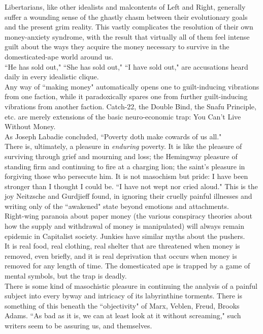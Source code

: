 Libertarians, like other idealists and malcontents of Left and Right, generally suffer a wounding sense of the ghastly chasm between their evolutionary goals and the present grim reality. This vastly complicates the resolution of their own money-anxiety syndrome, with the result that virtually all of them feel intense guilt about the ways they acquire the money necessary to survive in the domesticated-ape world around us.\\
``He has sold out," ``She has sold out," ``I have sold out," are accusations heard daily in every idealistic clique.\\
Any way of ``making money" automatically opens one to guilt-inducing vibrations from one faction, while it paradoxically spares one from further guilt-inducing vibrations from another faction. Catch-22, the Double Bind, the Snafu Principle, etc. are merely extensions of the basic neuro-economic trap: You Can't Live Without Money.\\
As Joseph Labadie concluded, ``Poverty doth make cowards of us all."\\
There is, ultimately, a pleasure in \emph{enduring} poverty. It is like the pleasure of surviving through grief and mourning and loss; the Hemingway pleasure of standing firm and continuing to fire at a charging lion; the saint's pleasure in forgiving those who persecute him. It is not masochism but pride: I have been stronger than I thought I could be. ``I have not wept nor cried aloud." This is the joy Neitzsche and Gurdjieff found, in ignoring their cruelly painful illnesses and writing only of the ``awakened" state beyond emotions and attachments.\\
Right-wing paranoia about paper money (the various conspiracy theories about how the supply and withdrawal of money is manipulated) will always remain epidemic in Capitalist society. Junkies have similar myths about the pushers.\\
It is real food, real clothing, real shelter that are threatened when money is removed, even briefly, and it is real deprivation that occurs when money is removed for any length of time. The domesticated ape is trapped by a game of mental symbols, but the trap is deadly.\\
There is some kind of masochistic pleasure in continuing the analysis of a painful subject into every byway and intricacy of its labyrinthine torments. There is something of this beneath the ``objectivity" of Marx, Veblen, Freud, Brooks Adams. ``As bad as it is, we can at least look at it without screaming," such writers seem to be assuring us, and themselves.\\
